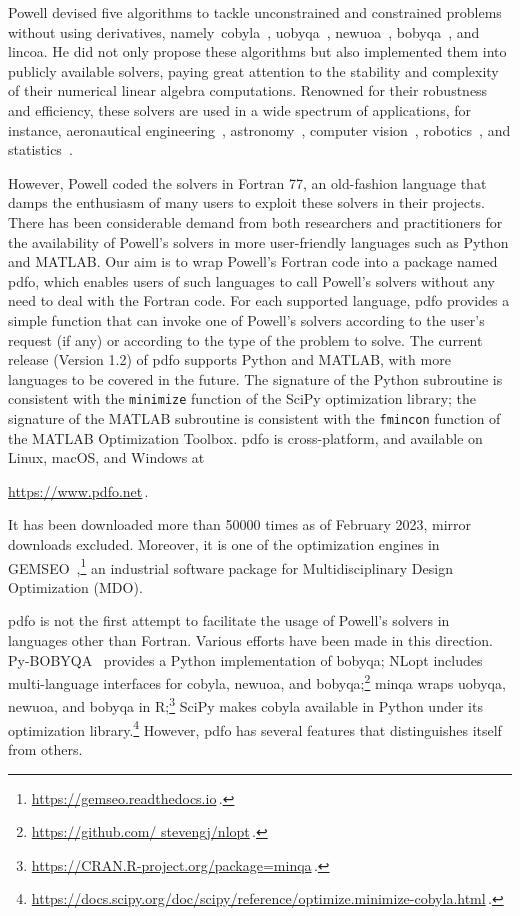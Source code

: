 \documentclass[
    smallextended,  %
    final,          %
]{svjour3}
\begin{document}
Powell devised five algorithms to tackle unconstrained and constrained problems without using derivatives, namely~\gls{cobyla}~\cite{Powell_1994}, \gls{uobyqa}~\cite{Powell_2002}, \gls{newuoa}~\cite{Powell_2006}, \gls{bobyqa}~\cite{Powell_2009}, and \gls{lincoa}.
He did not only propose these algorithms but also implemented them into publicly available solvers, paying great attention to the stability and complexity of their numerical linear algebra computations.
Renowned for their robustness and efficiency, these solvers are used in a wide spectrum of applications, for instance, aeronautical engineering~\cite{Gallard_Etal_2018}, astronomy~\cite{Mamon_Biviano_Boue_2013}, computer vision~\cite{Izadinia_Shan_Seitz_2017}, robotics~\cite{Mombaur_Truong_Laumond_2010}, and statistics~\cite{Bates_Etal_2015}.

However, Powell coded the solvers in Fortran 77, an old-fashion language that damps the enthusiasm of many users to exploit these solvers in their projects.
There has been considerable demand from both researchers and practitioners for the availability of Powell's solvers in more user-friendly languages such as Python and MATLAB.
Our aim is to wrap Powell's Fortran code into a package named \gls{pdfo}, which enables users of such languages to call Powell's solvers without any need to deal with the Fortran code.
For each supported language, \gls{pdfo} provides a simple function that can invoke one of Powell's solvers according to the user's request (if any) or according to the type of the problem to solve.
The current release (Version 1.2) of \gls{pdfo} supports Python and MATLAB, with more languages to be covered in the future.
The signature of the Python subroutine is consistent with the \texttt{minimize} function of the SciPy optimization library; the signature of the MATLAB subroutine is consistent with the \texttt{fmincon} function of the MATLAB Optimization Toolbox.
\gls{pdfo} is cross-platform, and available on Linux, macOS, and Windows at
\begin{center}
    \url{https://www.pdfo.net}\,.
\end{center}
It has been downloaded more than \num{50000} times as of February 2023, mirror downloads excluded.
Moreover, it is one of the optimization engines in GEMSEO~\cite{Gallard_Etal_2018},\footnote{\url{https://gemseo.readthedocs.io}\,.}
an industrial software package for Multidisciplinary Design Optimization (MDO).

\gls{pdfo} is not the first attempt to facilitate the usage of Powell's solvers in languages other than Fortran.
Various efforts have been made in this direction.
Py-BOBYQA~\cite{Cartis_Etal_2019,Cartis_Roberts_Sheridan-Methven_2022} provides a Python
implementation of \gls{bobyqa};
NLopt includes multi-language interfaces for \gls{cobyla}, \gls{newuoa}, and \gls{bobyqa};\footnote{\url{https://github.com/ stevengj/nlopt}\,.}
minqa wraps \gls{uobyqa}, \gls{newuoa}, and \gls{bobyqa} in R;\footnote{\url{https://CRAN.R-project.org/package=minqa}\,.}
SciPy makes \gls{cobyla} available in Python under its optimization library.\footnote{\url{https://docs.scipy.org/doc/scipy/reference/optimize.minimize-cobyla.html}\,.}
However, \gls{pdfo} has several features that distinguishes itself from others.
\end{document}
